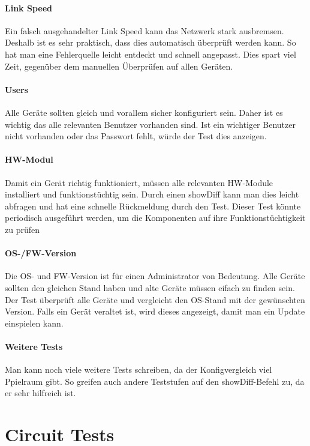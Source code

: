 \documentclass[a4,12pt]{scrartcl}
\begin{document}
\paragraph{Link Speed}\newline
Ein falsch ausgehandelter Link Speed kann das Netzwerk stark ausbremsen. Deshalb ist es sehr praktisch, dass dies automatisch überprüft werden kann. So hat man eine Fehlerquelle leicht entdeckt und schnell angepasst. Dies spart viel Zeit, gegenüber dem manuellen Überprüfen auf allen Geräten.
\paragraph{Users}\newline
Alle Geräte sollten gleich und vorallem sicher konfiguriert sein. Daher ist es wichtig das alle relevanten Benutzer vorhanden sind. Ist ein wichtiger Benutzer nicht vorhanden oder das Passwort fehlt, würde der Test dies anzeigen.
\paragraph{HW-Modul}\newline
Damit ein Gerät richtig funktioniert, müssen alle relevanten HW-Module installiert und funktionstüchtig sein. Durch einen showDiff kann man dies leicht abfragen und hat eine schnelle Rückmeldung durch den Test. Dieser Test könnte periodisch ausgeführt werden, um die Komponenten auf ihre Funk­ti­ons­tüch­tig­keit zu prüfen
\paragraph{OS-/FW-Version}\newline
Die OS- und FW-Version ist für einen Administrator von Bedeutung. Alle Geräte sollten den gleichen Stand haben und alte Geräte müssen eifach zu finden sein. Der Test überprüft alle Geräte und vergleicht den OS-Stand mit der gewünschten Version. Falls ein Gerät veraltet ist, wird dieses angezeigt, damit man ein Update einspielen kann.
\paragraph{Weitere Tests}\newline
Man kann noch viele weitere Tests schreiben, da der Konfigvergleich viel Ppielraum gibt. So greifen auch andere Teststufen auf den showDiff-Befehl zu, da er sehr hilfreich ist. 
\newpage
\section{Circuit Tests}
\end{document}
